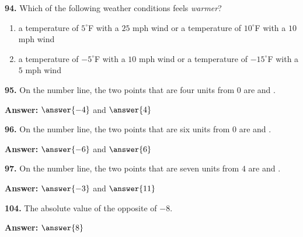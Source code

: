 \documentclass{ximera}
\begin{document}
\begin{problem}
\textbf{94.} Which of the following weather conditions feels \emph{warmer}?
  \begin{enumerate}[label=\textbf{\alph*.},leftmargin=2em,topsep=2pt,itemsep=1pt]
    \item a temperature of $5^\circ$F with a $25$ mph wind or a temperature of
          $10^\circ$F with a $10$ mph wind
    \item a temperature of $-5^\circ$F with a $10$ mph wind or a temperature of
          $-15^\circ$F with a $5$ mph wind
  \end{enumerate}

\begin{multipleChoice}
\end{multipleChoice}
\end{problem}

\begin{problem}
\textbf{95.} On the number line, the two points that are four units from $0$ are
       \blank{} and \blank.

\textbf{Answer:} $\answer{-4}$ and $\answer{4}$
\end{problem}

\begin{problem}
\textbf{96.} On the number line, the two points that are six units from $0$ are
       \blank{} and \blank.

\textbf{Answer:} $\answer{-6}$ and $\answer{6}$
\end{problem}

\begin{problem}
\textbf{97.} On the number line, the two points that are seven units from $4$ are
       \blank{} and \blank.

\textbf{Answer:} $\answer{-3}$ and $\answer{11}$
\end{problem}

\begin{problem}
\textbf{104.} The absolute value of the opposite of $-8$.

\textbf{Answer:} $\answer{8}$
\end{problem}
\end{document}
